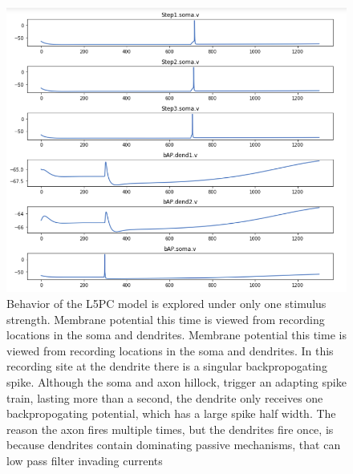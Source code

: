 \begin{figure}
    \begin{center}
    \includegraphics{figures/l5pc}
    \caption[Behavior of the L5PC model under optimized parameters]{Behavior of the L5PC model is explored under only one stimulus strength. Membrane potential this time is viewed from recording locations in the soma and dendrites.  Membrane potential this time is viewed from recording locations in the soma and dendrites. In this recording site at the dendrite there is a singular backpropogating spike. Although the soma and axon hillock, trigger an adapting spike train, lasting more than a second, the dendrite only receives one backpropogating potential, which has a large spike half width. The reason the axon fires multiple times, but the dendrites fire once, is because  dendrites contain dominating passive mechanisms, that can low pass filter invading currents} 
    \label{fig:after_optimization}
    \end{center}
\end{figure}    


